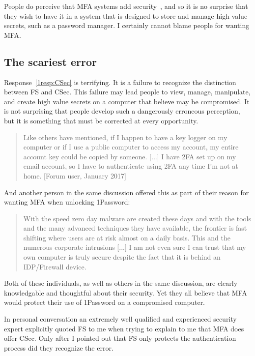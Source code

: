 \documentclass{soups}
\newcommand{\prop}[1]{\textsf{#1}}
\begin{document}
People do perceive that MFA systems add security~\autocites{gunsonETAL2011:CS,CristofaroDFN13},
and so it is no surprise that they wish to have it in a system that is designed to store and manage high value secrets, such as a password manager.
I certainly cannot blame people for wanting MFA\@.

\subsection{The scariest error}

Response~\ref{1resp:CSec} is terrifying.
It is a failure to recognize the distinction between \prop{FS} and  \prop{CSec}.
This failure may lead people to view, manage, manipulate, and create high value
secrets on a computer that believe may be compromised. It is not surprising that people develop such a dangerously erroneous perception, but it is something that must be corrected at every opportunity.

\begin{quotation}
  Like others have mentioned, if I happen to have a key logger on my computer or if I use a public computer to access my account, my entire account key could be copied by someone. [...] I have 2FA set up on my email account, so I have to authenticate using 2FA any time I'm not at home.
  [Forum user, January 2017]
\end{quotation}

And another person in the same discussion offered this as part of their reason
for wanting MFA when unlocking 1Password:

\begin{quotation}
  With the speed zero day malware are created these days and with the tools and the many advanced techniques they have available, the frontier is fast shifting where users are at risk almost on a daily basis. This and the numerous corporate intrusions [...] I am not even sure I can trust that my own computer is truly secure despite the fact that it is behind an IDP/Firewall device.
\end{quotation}

Both of these individuals, as well as others in the same discussion,
are clearly knowledgable and thoughtful about their security.
Yet they all believe that MFA would protect their use of 1Password on a compromised computer.

In personal conversation an extremely well qualified and experienced security expert explicitly quoted \prop{FS} to me when trying to explain to me that MFA does offer \prop{CSec}. Only after I pointed out that  \prop{FS} only protects the authentication process did they recognize the error.
\end{document}
